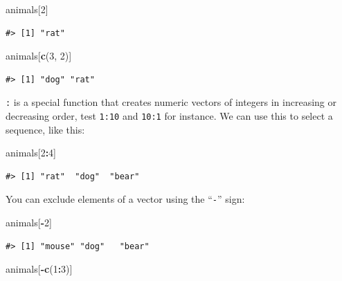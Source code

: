 \documentclass[]{book}
\newenvironment{Shaded}{\begin{snugshade}}{\end{snugshade}}
\newcommand{\KeywordTok}[1]{\textcolor[rgb]{0.13,0.29,0.53}{\textbf{#1}}}
\newcommand{\DecValTok}[1]{\textcolor[rgb]{0.00,0.00,0.81}{#1}}
\newcommand{\OperatorTok}[1]{\textcolor[rgb]{0.81,0.36,0.00}{\textbf{#1}}}
\newcommand{\NormalTok}[1]{#1}
\begin{document}
\begin{Shaded}
\begin{Highlighting}[]
\NormalTok{animals[}\DecValTok{2}\NormalTok{]}
\end{Highlighting}
\end{Shaded}

\begin{verbatim}
#> [1] "rat"
\end{verbatim}

\begin{Shaded}
\begin{Highlighting}[]
\NormalTok{animals[}\KeywordTok{c}\NormalTok{(}\DecValTok{3}\NormalTok{, }\DecValTok{2}\NormalTok{)]}
\end{Highlighting}
\end{Shaded}

\begin{verbatim}
#> [1] "dog" "rat"
\end{verbatim}

\texttt{:} is a special function that creates numeric vectors of
integers in increasing or decreasing order, test \texttt{1:10} and
\texttt{10:1} for instance. We can use this to select a sequence, like
this:

\begin{Shaded}
\begin{Highlighting}[]
\NormalTok{animals[}\DecValTok{2}\OperatorTok{:}\DecValTok{4}\NormalTok{]}
\end{Highlighting}
\end{Shaded}

\begin{verbatim}
#> [1] "rat"  "dog"  "bear"
\end{verbatim}

You can exclude elements of a vector using the ``\texttt{-}'' sign:

\begin{Shaded}
\begin{Highlighting}[]
\NormalTok{animals[}\OperatorTok{-}\DecValTok{2}\NormalTok{]}
\end{Highlighting}
\end{Shaded}

\begin{verbatim}
#> [1] "mouse" "dog"   "bear"
\end{verbatim}

\begin{Shaded}
\begin{Highlighting}[]
\NormalTok{animals[}\OperatorTok{-}\KeywordTok{c}\NormalTok{(}\DecValTok{1}\OperatorTok{:}\DecValTok{3}\NormalTok{)]}
\end{Highlighting}
\end{Shaded}
\end{document}
